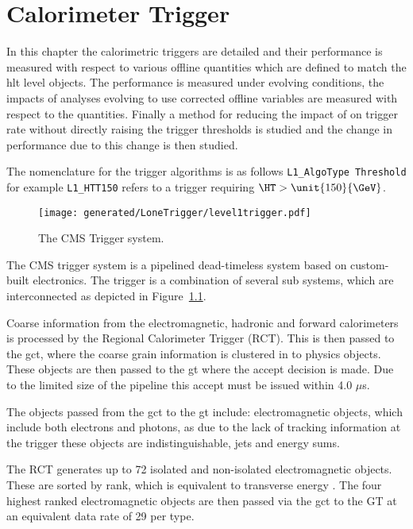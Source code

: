 \chapter{\Lone Calorimeter Trigger} %
\label{cha:level_one_trigger}
In this chapter the \Lone calorimetric triggers are detailed and their performance is measured with respect to various offline quantities which are defined to match the \ac{hlt} level objects. The performance is measured under evolving \pu conditions, the impacts of analyses evolving to use \pu corrected offline variables are measured with respect to the \Lone quantities. Finally a method for reducing the impact of \pu on \Lone trigger rate without directly raising the trigger thresholds is studied and the change in performance due to this change is then studied.

The nomenclature for the \Lone trigger algorithms is as follows \verb|L1_AlgoType Threshold| for example \verb|L1_HTT150| refers to a \Lone trigger requiring $\HT > \unit{150}{\GeV}$.

\begin{figure}[ht]
  \centering
    \texttt{[image: generated/LoneTrigger/level1trigger.pdf]}
  \caption{The CMS \Lone Trigger system.}
  \label{fig:figures_LoneTrigger_level1trigger}
\end{figure}

The CMS \Lone trigger system\cite{l1} is a pipelined dead-timeless system based 
on custom-built electronics.
The \Lone trigger is a combination of several sub systems, which are 
interconnected as depicted in 
Figure~\ref{fig:figures_LoneTrigger_level1trigger}.

Coarse information from the electromagnetic, hadronic and forward 
calorimeters is processed by the Regional Calorimeter Trigger (RCT). This is 
then passed to the \ac{gct}, where the coarse grain 
information is clustered in to physics objects. These objects are then passed 
to the \ac{gt} where the \Lone accept decision is made. Due to the 
limited size of the pipeline this \Lone accept must be issued within 4.0 
$\mu$s.

The objects passed from the \ac{gct} to the \ac{gt} include: electromagnetic objects, which include both electrons and photons, as due to the lack of tracking information at the \Lone trigger these objects are indistinguishable, jets and energy sums.

The RCT generates up to 72 isolated and non-isolated electromagnetic objects. 
These are sorted by rank, which is equivalent to transverse energy \ET. The 
four highest ranked electromagnetic objects are then passed via the \ac{gct} to the 
GT at an equivalent data rate of 29 \Gbs per type.

